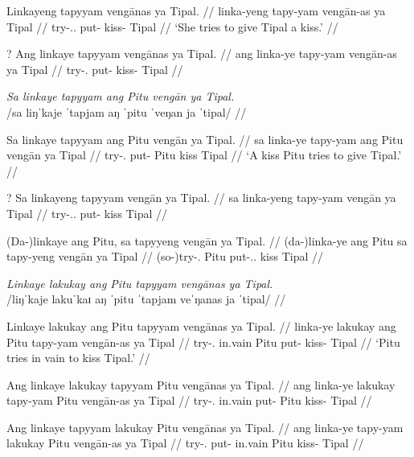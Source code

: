 \documentclass[12pt,a4paper]{scrartcl}
\newcommand{\TsgF}{{\Tsg}.{\F}}
\begin{document}
\gla Linkayeng tapyyam vengānas ya Tipal. //
\glb linka-yeng tapy-yam vengān-as ya Tipal //
\glc try-\TsgF{}.\Aarg{} put-\Ptcp{} kiss-\Parg{} \Loc{} Tipal //
\glft `She tries to give Tipal a kiss.' //
\endgl

\a\ljudge?\begingl
\gla Ang linkaye tapyyam vengānas ya Tipal. //
\glb ang linka-ye tapy-yam vengān-as ya Tipal //
\glc \AgtT{} try-\TsgF{} put-\Ptcp{} kiss-\Parg{} \Loc{} Tipal //
\endgl
\xe

\pex
\a\begingl
\glpreamble \textit{Sa linkaye tapyyam ang Pitu vengān ya Tipal.} \\
	/sa liŋˈkaje ˈtapjam aŋ ˈpitu ˈveŋan ja ˈtipal/ //

\gla Sa linkaye tapyyam ang Pitu vengān ya Tipal. //
\glb sa linka-ye tapy-yam ang Pitu vengān ya Tipal //
\glc \PatT{} try-\TsgF{} put-\Ptcp{} \Aarg{} Pitu kiss \Loc{} Tipal //
\glft `A kiss Pitu tries to give Tipal.' //
\endgl

\a\label{ex:pattopofembeddedditrans}\ljudge?\begingl
\gla Sa linkayeng tapyyam vengān ya Tipal. //
\glb sa linka-yeng tapy-yam vengān ya Tipal //
\glc \PatT{} try-\TsgF{}.\Aarg{} put-\Ptcp{} kiss \Loc{} Tipal //
\endgl

\a\begingl
\gla (Da-)linkaye ang Pitu, sa tapyyeng vengān ya Tipal. //
\glb (da-)linka-ye ang Pitu sa tapy-yeng vengān ya Tipal //
\glc (so-)try-\TsgF{} \Aarg{} Pitu \PatT{} put-\TsgF{}.\Aarg{} kiss \Loc{} Tipal //
\endgl
\xe

\pex
\a\begingl
\glpreamble \textit{Linkaye lakukay ang Pitu tapyyam vengānas ya Tipal.}\footnotemark \\
	/liŋˈkaje lakuˈkaɪ aŋ ˈpitu ˈtapjam veˈŋanas ja ˈtipal/ //

\gla Linkaye lakukay ang Pitu tapyyam vengānas ya Tipal. //
\glb linka-ye lakukay ang Pitu tapy-yam vengān-as ya Tipal //
\glc try-\TsgF{} in.vain \Aarg{} Pitu put-\Ptcp{} kiss-\Parg{} \Loc{} Tipal //
\glft `Pitu tries in vain to kiss Tipal.' //
\endgl

\a\begingl
\gla Ang linkaye lakukay tapyyam Pitu vengānas ya Tipal. //
\glb ang linka-ye lakukay tapy-yam Pitu vengān-as ya Tipal //
\glc \AgtT{} try-\TsgF{} in.vain put-\Ptcp{} Pitu kiss-\Parg{} \Loc{} Tipal //
\endgl

\a\begingl
\gla Ang linkaye tapyyam lakukay Pitu vengānas ya Tipal. //
\glb ang linka-ye tapy-yam lakukay Pitu vengān-as ya Tipal //
\glc \AgtT{} try-\TsgF{} put-\Ptcp{} in.vain Pitu kiss-\Parg{} \Loc{} Tipal //
\endgl
\xe

\end{document}
